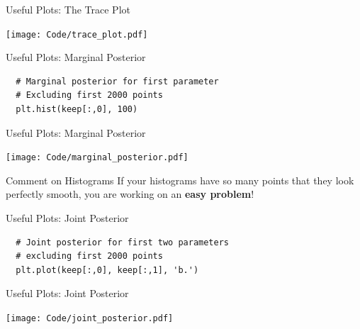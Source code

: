 \begin{frame}[t]{Useful Plots: The Trace Plot}
\begin{center}
\texttt{[image: Code/trace\_plot.pdf]}
\end{center}
\end{frame}


\begin{frame}[t, fragile]{Useful Plots: Marginal Posterior}
\begin{verbatim}
  # Marginal posterior for first parameter
  # Excluding first 2000 points
  plt.hist(keep[:,0], 100)
\end{verbatim}
\end{frame}

\begin{frame}[t]{Useful Plots: Marginal Posterior}
\begin{center}
\texttt{[image: Code/marginal\_posterior.pdf]}
\end{center}
\end{frame}

\begin{frame}[t]{Comment on Histograms}
If your histograms have so many points that they look perfectly smooth, you
are working on an {\bf easy problem}!
\end{frame}


\begin{frame}[t, fragile]{Useful Plots: Joint Posterior}
\begin{verbatim}
  # Joint posterior for first two parameters
  # excluding first 2000 points
  plt.plot(keep[:,0], keep[:,1], 'b.')
\end{verbatim}
\end{frame}

\begin{frame}[t]{Useful Plots: Joint Posterior}
\begin{center}
\texttt{[image: Code/joint\_posterior.pdf]}
\end{center}
\end{frame}


